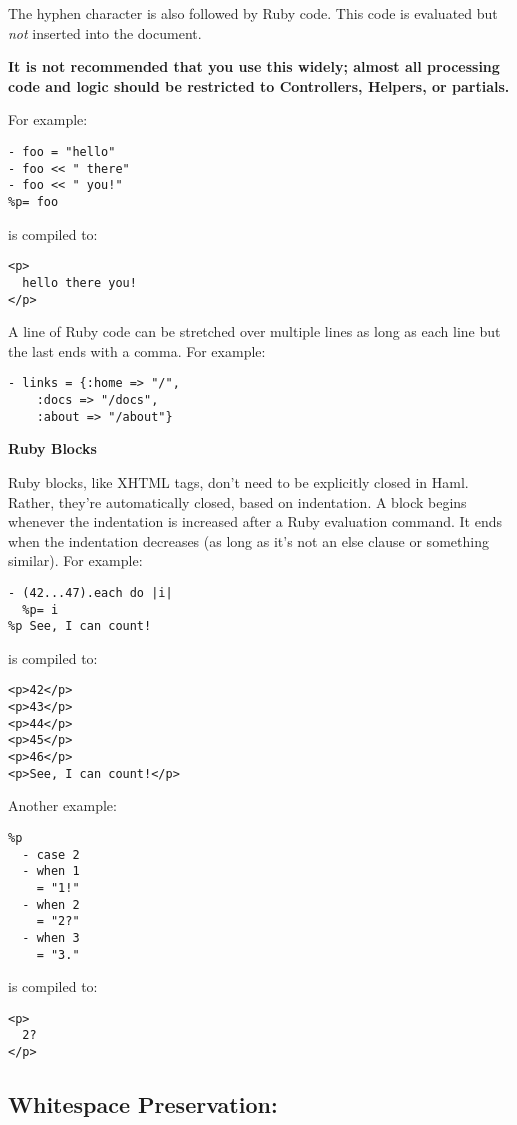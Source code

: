 \documentclass[9pt]{article}
\begin{document}
 The hyphen character is also followed by Ruby code. This code is evaluated but \emph{not}
 inserted into the document.


 \textbf{It is not recommended that you use this widely; almost all processing code and logic should be restricted to Controllers, Helpers, or partials.}



 For example:
\begin{verbatim}
- foo = "hello"
- foo << " there"
- foo << " you!"
%p= foo
\end{verbatim}


 is compiled to:
\begin{verbatim}
<p>
  hello there you!
</p>
\end{verbatim}


 A line of Ruby code can be stretched over multiple lines as long as each line but the last ends with a comma. For example:
\begin{verbatim}
- links = {:home => "/",
    :docs => "/docs",
    :about => "/about"}
\end{verbatim}
\textbf{Ruby Blocks}


 Ruby blocks, like XHTML tags, don’t need to be explicitly closed in Haml. Rather, they’re automatically closed, based on indentation. A block begins whenever the indentation is increased after a Ruby evaluation command. It ends when the indentation decreases (as long as it’s not an else clause or something similar). For example:
\begin{verbatim}
- (42...47).each do |i|
  %p= i
%p See, I can count!
\end{verbatim}


 is compiled to:
\begin{verbatim}
<p>42</p>
<p>43</p>
<p>44</p>
<p>45</p>
<p>46</p>
<p>See, I can count!</p>
\end{verbatim}


 Another example:
\begin{verbatim}
%p
  - case 2
  - when 1
    = "1!"
  - when 2
    = "2?"
  - when 3
    = "3."
\end{verbatim}


 is compiled to:
\begin{verbatim}
<p>
  2?
</p>
\end{verbatim}
\subsection{Whitespace Preservation: ~}
\end{document}
